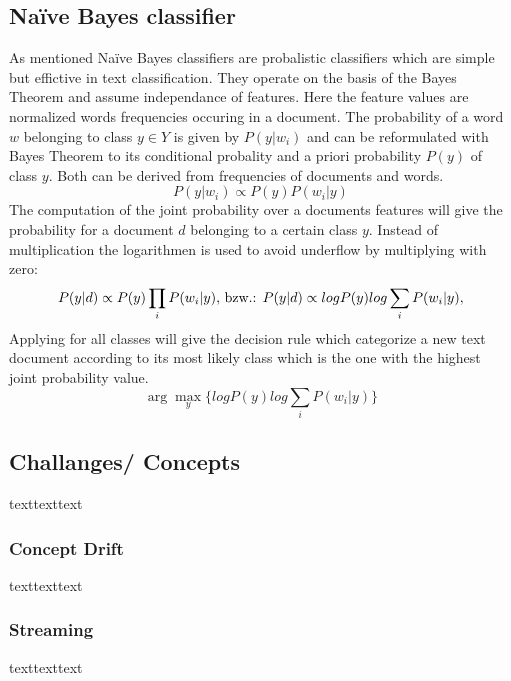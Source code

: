 \documentclass[12pt]{article}
\begin{document}
\subsection{Na\"ive Bayes classifier}

As mentioned Na\"ive Bayes classifiers are probalistic classifiers which are simple but effictive in text classification. They operate on the basis of the Bayes Theorem and assume independance of features. Here the feature values are normalized  words frequencies occuring in a document. The probability of a word $w$ belonging to class $y \in Y$ is given by $P(y|w_i)$ and can be reformulated with Bayes Theorem to its conditional probality and a priori probability $ P(y)$ of class $y$. Both can be derived from frequencies of documents and words.
$$
P(y|w_i) \propto P(y)P(w_i|y)
$$
The computation of the joint probability over a documents features will give the probability for a  document $d$ belonging to a certain class $y$. Instead of multiplication the logarithmen is used to avoid underflow by multiplying with zero:
$$
P(y|d) \propto P(y)\prod_i P(w_i|y)\space
\textrm{,  bzw.:    }
P(y|d) \propto log P(y) log \sum_i P(w_i|y),
$$
Applying for all classes will give the decision rule which categorize a new text document according to its most likely class which is the one with the highest joint probability value.
$$
\arg\max_y\{ log P(y) log \sum_i P(w_i|y)\}
$$

\subsection{Challanges/ Concepts}
texttexttext

\subsubsection{Concept Drift}
texttexttext

\subsubsection{Streaming}
texttexttext
\end{document}

